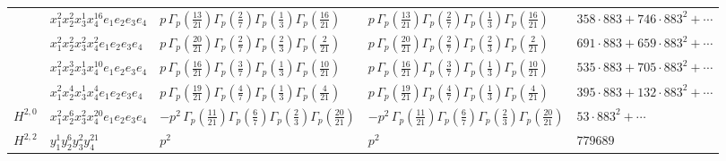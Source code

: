 \documentclass[11pt]{article}
\begin{document}
\begin{table}[ht]
{\begin{tabular}{@{}lllll@{}}
 & $x_{1}^{2} x_{2}^{2} x_{3}^{1} x_{4}^{16}  e_{1} e_{2} e_{3} e_{4}$ & $p \, \Gamma_p \left( \frac{13}{21} \right) \Gamma_p \left( \frac{2}{7} \right) \Gamma_p \left( \frac{1}{3} \right) \Gamma_p \left( \frac{16}{21} \right)$ & $p \, \Gamma_p \left( \frac{13}{21} \right) \Gamma_p \left( \frac{2}{7} \right) \Gamma_p \left( \frac{1}{3} \right) \Gamma_p \left( \frac{16}{21} \right)$ & $358{\cdot}883{+}746{\cdot}883^{2}{+}\cdots$ \\
 & $x_{1}^{2} x_{2}^{2} x_{3}^{2} x_{4}^{2}  e_{1} e_{2} e_{3} e_{4}$ & $p \, \Gamma_p \left( \frac{20}{21} \right) \Gamma_p \left( \frac{2}{7} \right) \Gamma_p \left( \frac{2}{3} \right) \Gamma_p \left( \frac{2}{21} \right)$ & $p \, \Gamma_p \left( \frac{20}{21} \right) \Gamma_p \left( \frac{2}{7} \right) \Gamma_p \left( \frac{2}{3} \right) \Gamma_p \left( \frac{2}{21} \right)$ & $691{\cdot}883{+}659{\cdot}883^{2}{+}\cdots$ \\
 & $x_{1}^{2} x_{2}^{3} x_{3}^{1} x_{4}^{10}  e_{1} e_{2} e_{3} e_{4}$ & $p \, \Gamma_p \left( \frac{16}{21} \right) \Gamma_p \left( \frac{3}{7} \right) \Gamma_p \left( \frac{1}{3} \right) \Gamma_p \left( \frac{10}{21} \right)$ & $p \, \Gamma_p \left( \frac{16}{21} \right) \Gamma_p \left( \frac{3}{7} \right) \Gamma_p \left( \frac{1}{3} \right) \Gamma_p \left( \frac{10}{21} \right)$ & $535{\cdot}883{+}705{\cdot}883^{2}{+}\cdots$ \\
 & $x_{1}^{2} x_{2}^{4} x_{3}^{1} x_{4}^{4}  e_{1} e_{2} e_{3} e_{4}$ & $p \, \Gamma_p \left( \frac{19}{21} \right) \Gamma_p \left( \frac{4}{7} \right) \Gamma_p \left( \frac{1}{3} \right) \Gamma_p \left( \frac{4}{21} \right)$ & $p \, \Gamma_p \left( \frac{19}{21} \right) \Gamma_p \left( \frac{4}{7} \right) \Gamma_p \left( \frac{1}{3} \right) \Gamma_p \left( \frac{4}{21} \right)$ & $395{\cdot}883{+}132{\cdot}883^{2}{+}\cdots$ \\
\midrule
$H^{2,0}$ & $x_{1}^{2} x_{2}^{6} x_{3}^{2} x_{4}^{20}  e_{1} e_{2} e_{3} e_{4}$ & $- p^{2} \, \Gamma_p \left( \frac{11}{21} \right) \Gamma_p \left( \frac{6}{7} \right) \Gamma_p \left( \frac{2}{3} \right) \Gamma_p \left( \frac{20}{21} \right)$ & $- p^{2} \, \Gamma_p \left( \frac{11}{21} \right) \Gamma_p \left( \frac{6}{7} \right) \Gamma_p \left( \frac{2}{3} \right) \Gamma_p \left( \frac{20}{21} \right)$ & $53{\cdot}883^{2}{+}\cdots$ \\
\midrule
$H^{2,2}$ & $y_{1}^{1} y_{2}^{6} y_{3}^{2} y_{4}^{21}$ & $p^{2} \,$ & $p^{2} \,$ & $779689$ \\
\bottomrule
\end{tabular}
}
\renewcommand{\arraystretch}{1.0}
\end{table}
\end{document}
